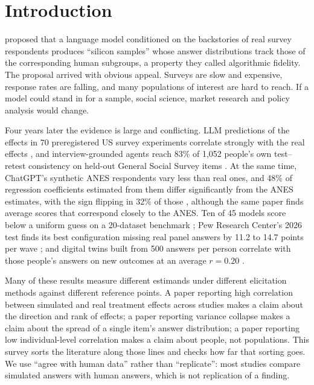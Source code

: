 \documentclass[11pt]{article}
\begin{document}
\section{Introduction}

\citet{argyle2023} proposed that a language model conditioned on the backstories of real survey respondents produces ``silicon samples'' whose answer distributions track those of the corresponding human subgroups, a property they called algorithmic fidelity. The proposal arrived with obvious appeal. Surveys are slow and expensive, response rates are falling, and many populations of interest are hard to reach. If a model could stand in for a sample, social science, market research and policy analysis would change.

Four years later the evidence is large and conflicting. LLM predictions of the effects in 70 preregistered US survey experiments correlate strongly with the real effects \citep{ashokkumar2026}, and interview-grounded agents reach 83\% of 1,052 people's own test--retest consistency on held-out General Social Survey items \citep{park2024}. At the same time, ChatGPT's synthetic ANES respondents vary less than real ones, and 48\% of regression coefficients estimated from them differ significantly from the ANES estimates, with the sign flipping in 32\% of those \citep{bisbee2024}, although the same paper finds average scores that correspond closely to the ANES. Ten of 45 models score below a uniform guess on a 20-dataset benchmark \citep{hu2025simbench}; Pew Research Center's 2026 test finds its best configuration missing real panel answers by 11.2 to 14.7 points per wave \citep{pew2026}; and digital twins built from 500 answers per person correlate with those people's answers on new outcomes at an average $r = 0.20$ \citep{peng2025funhouse}.

Many of these results measure different estimands under different elicitation methods against different reference points. A paper reporting high correlation between simulated and real treatment effects across studies makes a claim about the direction and rank of effects; a paper reporting variance collapse makes a claim about the spread of a single item's answer distribution; a paper reporting low individual-level correlation makes a claim about people, not populations. This survey sorts the literature along those lines and checks how far that sorting goes. We use ``agree with human data'' rather than ``replicate'': most studies compare simulated answers with human answers, which is not replication of a finding.
\end{document}
